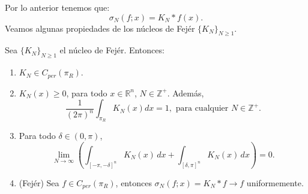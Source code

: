     Por lo anterior tenemos que:
    $$\sigma_N(f;x) = K_N * f(x).$$
    Veamos algunas propiedades de los núcleos de Fejér $\{K_N\}_{N \geq 1}$.
    \begin{proposition}\label{proposition:fejer}
      Sea $\{K_N\}_{N\geq 1}$ el núcleo de Fejér. Entonces:
      \begin{enumerate}
        \item $K_N \in C_{per}(\pi_R)$.
        \item $K_N(x) \geq 0$, para todo $x \in \mathbb{R}^{n}$, $N \in \mathbb{Z}^+$. Además, 
          $$\frac{1}{(2\pi)^{n}} \int_{\pi_R} K_N(x) dx = 1, \text{ para cualquier } N \in \mathbb{Z}^+.$$
        \item Para todo $\delta \in (0, \pi)$,
          $$\lim_{N \to \infty} \left( \int_{[-\pi,-\delta]^{n}} K_N(x) \, dx + \int_{[\delta,\pi]^{n}} K_N(x) \, dx \right) = 0.$$
          \item (Fejér) Sea $f \in C_{per}(\pi_R)$, entonces $\sigma_N(f; x) = K_N*f \to f$ uniformemente.
      \end{enumerate}
    \end{proposition}
